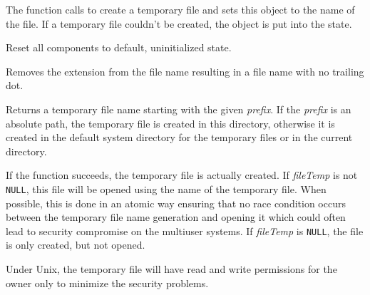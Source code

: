 
The function calls  to
create a temporary file and sets this object to the name of the file. If a
temporary file couldn't be created, the object is put into the\rtfsp
{} state.


\label{wxfilenameclear}


Reset all components to default, uninitialized state.


\label{wxfilenameclearext}


Removes the extension from the file name resulting in a 
file name with no trailing dot.



\label{wxfilenamecreatetempfilename}


Returns a temporary file name starting with the given {\it prefix}. If
the {\it prefix} is an absolute path, the temporary file is created in this
directory, otherwise it is created in the default system directory for the
temporary files or in the current directory.

If the function succeeds, the temporary file is actually created. If\rtfsp
{\it fileTemp} is not {\tt NULL}, this file will be opened using the name of
the temporary file. When possible, this is done in an atomic way ensuring that
no race condition occurs between the temporary file name generation and opening
it which could often lead to security compromise on the multiuser systems.
If {\it fileTemp} is {\tt NULL}, the file is only created, but not opened.

Under Unix, the temporary file will have read and write permissions for the
owner only to minimize the security problems.



